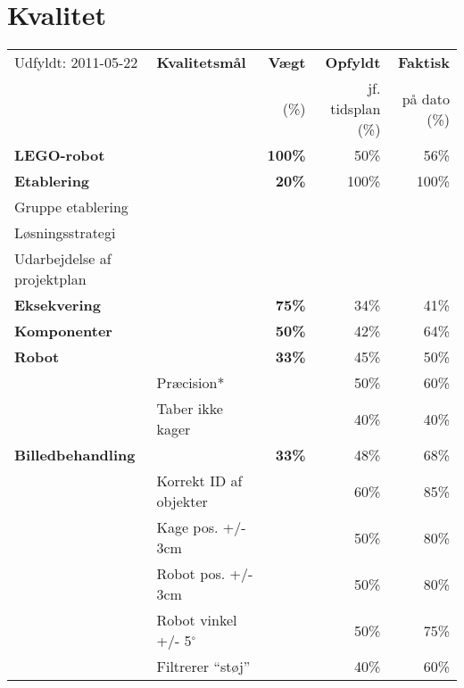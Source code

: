\section{Kvalitet}
\begin{footnotesize}
\begin{center}
\begin{tabular}{l | l | r r r}
	\footnotesize{Udfyldt: 2011-05-22}	& \textbf{Kvalitetsmål} & \textbf{Vægt} & \textbf{Opfyldt} & \textbf{Faktisk}\\
	& & \footnotesize{(\%)}	& \footnotesize{jf. tidsplan (\%)}	& \footnotesize{på dato (\%)} \\
	\hline
	\textbf{LEGO-robot}
																&		& \textbf{100\%} & 50\% & 56\% \\
	\hline
	\hline
	\textbf{Etablering}
																&		& \textbf{20\%} 	& 	100\%	& 100\% \\
	\hspace*{0.3cm} Gruppe etablering
					 											&		&		&		& \\
	\hspace*{0.3cm} Løsningsstrategi
					 											&		&		&		& \\
	\hspace*{0.3cm} Udarbejdelse af projektplan 
																&		&		&		& \\
	\hline
	\textbf{Eksekvering}
																&		& \textbf{75\%}	& 34\% & 41\% \\		
	\hspace*{0.3cm}\textbf{Komponenter}
																&		& \textbf{50\%}		& 	42\% & 64\%\\
	\hspace*{0.3cm}\hspace*{0.3cm} \textbf{Robot}
																& 		& \textbf{33\%} 	& 	45\% & 50\% \\
	& Præcision* & & 50\% & 60\% \\
	& Taber ikke kager & & 40\% & 40\% \\
	\hspace*{0.3cm}\hspace*{0.3cm} \textbf{Billedbehandling}
																& & \textbf{33\%}		&	48\% & 	68\% \\
	& Korrekt ID af objekter & & 60\% & 85\% \\
	& Kage pos. +/- 3cm & & 50\% & 80\% \\
	& Robot pos. +/- 3cm & & 50\% & 80\% \\
	& Robot vinkel +/- 5$^\circ$ & & 50\% & 75\% \\
	& Filtrerer "`støj"' & & 40\% & 60\% \\

\end{tabular}
\end{center}
\end{footnotesize}
